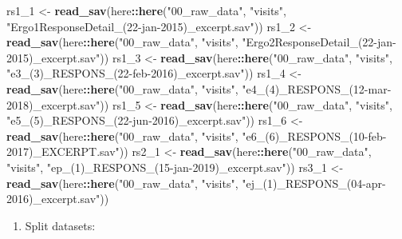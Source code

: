 \documentclass[]{book}
\newenvironment{Shaded}{\begin{snugshade}}{\end{snugshade}}
\newcommand{\DecValTok}[1]{\textcolor[rgb]{0.00,0.00,0.81}{#1}}
\newcommand{\KeywordTok}[1]{\textcolor[rgb]{0.13,0.29,0.53}{\textbf{#1}}}
\newcommand{\NormalTok}[1]{#1}
\newcommand{\OperatorTok}[1]{\textcolor[rgb]{0.81,0.36,0.00}{\textbf{#1}}}
\newcommand{\StringTok}[1]{\textcolor[rgb]{0.31,0.60,0.02}{#1}}
\providecommand{\tightlist}{%
  \setlength{\itemsep}{0pt}\setlength{\parskip}{0pt}}
\begin{document}
\begin{Shaded}
\begin{Highlighting}[]
\NormalTok{rs1_}\DecValTok{1}\NormalTok{ <-}\StringTok{ }\KeywordTok{read_sav}\NormalTok{(here}\OperatorTok{::}\KeywordTok{here}\NormalTok{(}\StringTok{"00_raw_data"}\NormalTok{, }\StringTok{"visits"}\NormalTok{, }\StringTok{"Ergo1ResponseDetail_(22-jan-2015)_excerpt.sav"}\NormalTok{))}
\NormalTok{rs1_}\DecValTok{2}\NormalTok{ <-}\StringTok{ }\KeywordTok{read_sav}\NormalTok{(here}\OperatorTok{::}\KeywordTok{here}\NormalTok{(}\StringTok{"00_raw_data"}\NormalTok{, }\StringTok{"visits"}\NormalTok{, }\StringTok{"Ergo2ResponseDetail_(22-jan-2015)_excerpt.sav"}\NormalTok{))}
\NormalTok{rs1_}\DecValTok{3}\NormalTok{ <-}\StringTok{ }\KeywordTok{read_sav}\NormalTok{(here}\OperatorTok{::}\KeywordTok{here}\NormalTok{(}\StringTok{"00_raw_data"}\NormalTok{, }\StringTok{"visits"}\NormalTok{, }\StringTok{"e3_(3)_RESPONS_(22-feb-2016)_excerpt.sav"}\NormalTok{))}
\NormalTok{rs1_}\DecValTok{4}\NormalTok{ <-}\StringTok{ }\KeywordTok{read_sav}\NormalTok{(here}\OperatorTok{::}\KeywordTok{here}\NormalTok{(}\StringTok{"00_raw_data"}\NormalTok{, }\StringTok{"visits"}\NormalTok{, }\StringTok{"e4_(4)_RESPONS_(12-mar-2018)_excerpt.sav"}\NormalTok{))}
\NormalTok{rs1_}\DecValTok{5}\NormalTok{ <-}\StringTok{ }\KeywordTok{read_sav}\NormalTok{(here}\OperatorTok{::}\KeywordTok{here}\NormalTok{(}\StringTok{"00_raw_data"}\NormalTok{, }\StringTok{"visits"}\NormalTok{, }\StringTok{"e5_(5)_RESPONS_(22-jun-2016)_excerpt.sav"}\NormalTok{))}
\NormalTok{rs1_}\DecValTok{6}\NormalTok{ <-}\StringTok{ }\KeywordTok{read_sav}\NormalTok{(here}\OperatorTok{::}\KeywordTok{here}\NormalTok{(}\StringTok{"00_raw_data"}\NormalTok{, }\StringTok{"visits"}\NormalTok{, }\StringTok{"e6_(6)_RESPONS_(10-feb-2017)_EXCERPT.sav"}\NormalTok{))}
\NormalTok{rs2_}\DecValTok{1}\NormalTok{ <-}\StringTok{ }\KeywordTok{read_sav}\NormalTok{(here}\OperatorTok{::}\KeywordTok{here}\NormalTok{(}\StringTok{"00_raw_data"}\NormalTok{, }\StringTok{"visits"}\NormalTok{, }\StringTok{"ep_(1)_RESPONS_(15-jan-2019)_excerpt.sav"}\NormalTok{))}
\NormalTok{rs3_}\DecValTok{1}\NormalTok{ <-}\StringTok{ }\KeywordTok{read_sav}\NormalTok{(here}\OperatorTok{::}\KeywordTok{here}\NormalTok{(}\StringTok{"00_raw_data"}\NormalTok{, }\StringTok{"visits"}\NormalTok{, }\StringTok{"ej_(1)_RESPONS_(04-apr-2016)_excerpt.sav"}\NormalTok{))}
\end{Highlighting}
\end{Shaded}

\begin{enumerate}
\def\labelenumi{\arabic{enumi}.}
\setcounter{enumi}{1}
\tightlist
\item
  Split datasets:
\end{enumerate}
\end{document}
